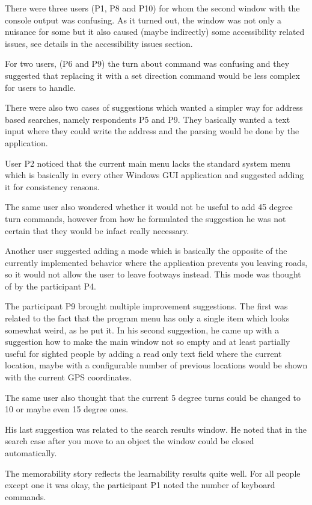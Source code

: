 \documentclass[nolof,digital]{fithesis3}
\begin{document}
There were three users (P1, P8 and P10) for whom the second window with the console output was confusing. As it turned out, the window was not only a nuisance for some but it also caused (maybe indirectly) some accessibility related issues, see details in the accessibility issues section.

For two users, (P6 and P9) the turn about command was confusing and they suggested that replacing it with a set direction command would be less complex for users to handle.

There were also two cases of suggestions which wanted a simpler way for address based searches, namely respondents P5 and P9. They basically wanted a text input where they could write the address and the parsing would be done by the application.

User P2 noticed that the current main menu lacks the standard system menu which is basically in every other Windows GUI application and suggested adding it for consistency reasons.

The same user also wondered whether it would not be useful to add 45 degree turn commands, however from how he formulated the suggestion he was not certain that they would be infact really necessary.

Another user suggested adding a mode which is basically the opposite of the currently implemented behavior where the application prevents you leaving roads, so it would not allow the user to leave footways instead. This mode was thought of by the participant P4.

The participant P9 brought multiple improvement suggestions. The first was related to the fact that the program menu has only a single item which looks somewhat weird, as he put it. In his second suggestion, he came up with a suggestion how to make the main window not so empty and at least partially useful for sighted people by adding a read only text field where the current location, maybe with a configurable number of previous locations would be shown with the current GPS coordinates.

The same user also thought that the current 5 degree turns could be changed to 10 or maybe even 15 degree ones.

His last suggestion was related to the search results window. He noted that in the search case after you move to an object the window could be closed automatically.

The memorability story reflects the learnability results quite well. For all people except one it was okay, the participant P1 noted the number of keyboard commands.
\end{document}
